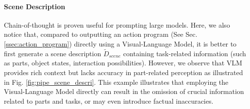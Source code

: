 \paragraph{Scene Description}
Chain-of-thought\citep{wei2023chainofthought} is proven useful for prompting large models. Here, we also notice that, compared to outputting an action program (See Sec. \ref{ssec:action_program}) directly using a Visual-Language Model, it is better to first generate a scene description $\tilde{D}_{scene}$ containing task-related information (such as parts, object states, interaction possibilities).
However, we observe that VLM provides rich context but lacks accuracy in part-related perception as illustrated in Fig. \ref{fig:pipe_scene_descri}. This example illustrates that employing the Visual-Language Model directly can result in the omission of crucial information related to parts and tasks, or may even introduce factual inaccuracies.

